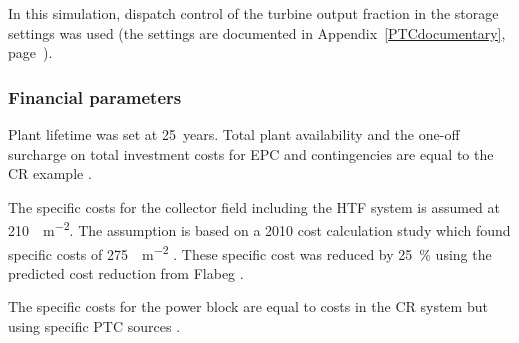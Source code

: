In this simulation, dispatch control of the turbine output fraction in the storage settings was used (the settings are documented in Appendix~\ref{PTCdocumentary}, page~\pageref{PTC_turbineoutput}). 

\subsubsection{Financial parameters}
Plant lifetime was set at \SI{25}{years}. Total plant availability and the one-off surcharge on total investment costs for EPC and contingencies are equal to the CR example \cite{Platzer2014}.

The specific costs for the collector field including the \ac{HTF} system is assumed at \SI{210}{\usd\per\square\metre}. The assumption is based on a 2010 cost calculation study which found specific costs of \SI{275}{\usd\per\square\metre} \cite{Morin2012}. These specific cost was reduced by \SI{25}{\percent} using the predicted cost reduction from Flabeg \cite{FLABEG_FE_GmbH2015}.

The specific costs for the power block are equal to costs in the \ac{CR} system but using specific \ac{PTC} sources \cite{Platzer2014}.


